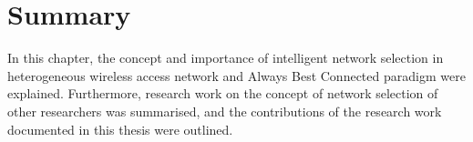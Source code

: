 \section{Summary} %
\label{sec:summary_intelligent}
In this chapter, the concept and importance of intelligent network selection in heterogeneous wireless access network and Always Best Connected paradigm were explained. Furthermore, research work on the concept of network selection of other researchers was summarised, and the contributions of the research work documented in this thesis were outlined.

